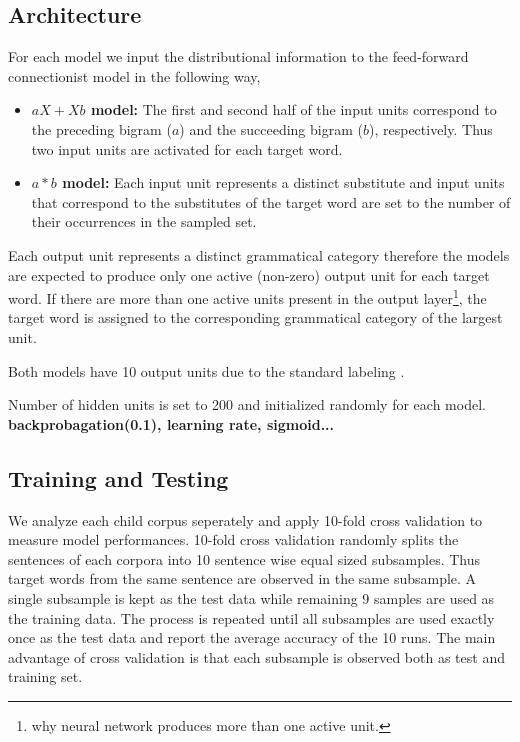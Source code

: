 \subsection{Architecture}
For each model we input the distributional information to the
feed-forward connectionist model in the following way,

\begin{itemize}
\item {\bf$aX+Xb$ model:} The first and second half of the input units
  correspond to the preceding bigram ($a$) and the succeeding bigram
  ($b$), respectively.  Thus two input units are activated for each
  target word.
\item {\bf $a*b$ model:} Each input unit represents a distinct
  substitute and input units that correspond to the substitutes of the
  target word are set to the number of their occurrences in the
  sampled set.
\end{itemize}

Each output unit represents a distinct grammatical category therefore
the models are expected to produce only one active (non-zero) output
unit for each target word.  If there are more than one active units
present in the output layer\footnote{why neural network produces more
  than one active unit.}, the target word is assigned to the
corresponding grammatical category of the largest unit.

Both models have 10 output units due to the standard labeling
\citep*{Mintz200391}.

Number of hidden units is set to 200 and initialized randomly for each
model. {\bf backprobagation(0.1), learning rate, sigmoid...}

\subsection{Training and Testing}


We analyze each child corpus seperately and apply 10-fold cross
validation to measure model performances.  10-fold cross validation
randomly splits the sentences of each corpora into 10 sentence wise
equal sized subsamples.  Thus target words from the same sentence are
observed in the same subsample.  A single subsample is kept as the
test data while remaining 9 samples are used as the training data.
The process is repeated until all subsamples are used exactly once as
the test data and report the average accuracy of the 10 runs.  The
main advantage of cross validation is that each subsample is observed
both as test and training set.

